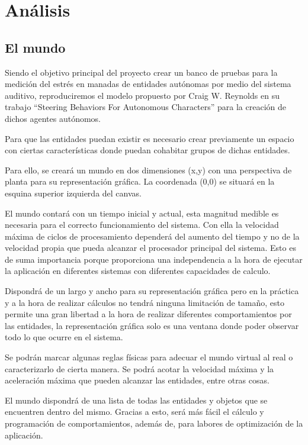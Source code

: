 \section{Análisis}
\label{section:analisis}

\subsection{El mundo}
Siendo el objetivo principal del proyecto crear un banco de pruebas para la medición del estrés en manadas de entidades autónomas por medio del sistema auditivo, reproduciremos el modelo propuesto por Craig W. Reynolds en su trabajo “Steering Behaviors For Autonomous Characters” para la creación de dichos agentes autónomos.
 
Para que las entidades puedan existir es necesario crear previamente un espacio con ciertas características donde puedan cohabitar grupos de dichas entidades.
 
Para ello, se creará un mundo en dos dimensiones (x,y) con una perspectiva de planta para su representación gráfica. La coordenada (0,0) se situará en la esquina superior izquierda del canvas.
 
El mundo contará con un tiempo inicial y actual, esta magnitud medible es necesaria para el correcto funcionamiento del sistema. Con ella la velocidad máxima de ciclos de procesamiento dependerá del aumento del tiempo y no de la velocidad propia que pueda alcanzar el procesador principal del sistema. Esto es de suma importancia porque proporciona una independencia a la hora de ejecutar la aplicación en diferentes sistemas con diferentes capacidades de calculo.
 
Dispondrá de un largo y ancho para su representación gráfica pero en la práctica y a la hora de realizar cálculos no tendrá ninguna limitación de tamaño, esto permite una gran libertad a la hora de realizar diferentes comportamientos por las entidades, la representación gráfica solo es una ventana donde poder observar todo lo que ocurre en el sistema.
 
Se podrán marcar algunas reglas físicas para adecuar el mundo virtual al real o caracterizarlo de cierta manera. Se podrá acotar la velocidad máxima y la aceleración máxima que pueden alcanzar las entidades, entre otras cosas.
 
El mundo dispondrá de una lista de todas las entidades y objetos que se encuentren dentro del mismo. Gracias a esto, será más fácil el cálculo y programación de comportamientos, además de, para labores de optimización de la aplicación.
 
